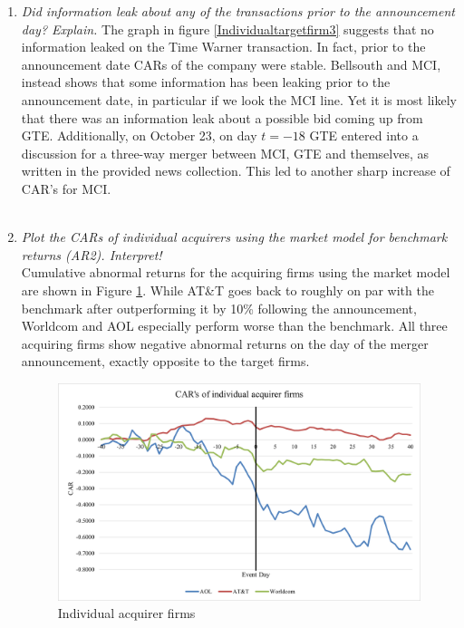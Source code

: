 \documentclass[11pt,a4paper,openany,oneside]{article}%
\begin{document}
\begin{enumerate}[label=\alph*),leftmargin=*]
\item \textit{Did information leak about any of the transactions prior to the announcement day? Explain.} \newline
The graph in figure \ref{Individualtargetfirm3} suggests that no information leaked on the Time Warner transaction. In fact, prior to the announcement date CARs of the company were stable. Bellsouth and MCI, instead shows that some information has been leaking prior to the announcement date, in particular if we look the MCI line. Yet it is most likely that there was an information leak about a possible bid coming up from GTE. Additionally, on October 23, on day $t=-18$ GTE entered into a discussion for a three-way merger between MCI, GTE and themselves, as written in the provided news collection. This led to another sharp increase of CAR’s for MCI.\\\\

\item \textit{Plot the CARs of individual acquirers using the market model for benchmark returns (AR2). Interpret!}\\
Cumulative abnormal returns for the acquiring firms using the market model are shown in Figure \ref{aqu}.
While AT\&T goes back to roughly on par with the benchmark after outperforming it by 10\%
following the announcement, Worldcom and AOL especially perform worse than the
benchmark. All three acquiring firms show negative abnormal returns on the day of the merger
announcement, exactly opposite to the target firms.\newline

\begin{figure}[H]
    \centering
    \includegraphics[scale=0.75]{Bild4.png}
    \caption{Individual acquirer firms}
    \label{aqu}
\end{figure}
\end{enumerate}
\end{document}
